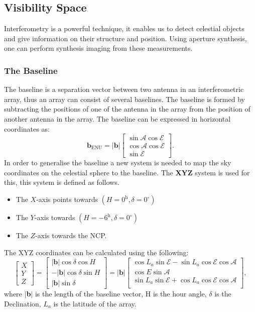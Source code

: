 \subsection{Visibility Space}
Interferometry is a powerful technique, it enables us to detect celestial objects and give information on their structure and position. Using aperture synthesis, one can perform synthesis imaging from these measurements\cite{TEXTBOOK}. 
\subsubsection{The Baseline}
The baseline is a separation vector between two antenna in an interferometric array, thus an array can consist of several baselines. The baseline is formed by subtracting the positions of one of the antenna in the array from the position of another antenna in the array. The baseline can be expressed in horizontal coordinates as: \begin{equation*}
\mathbf{b}_{\text{ENU}}
=
\lvert \mathbf{b} \rvert
\begin{bmatrix}
\sin \mathcal{A} \cos \mathcal{E}\\
\cos \mathcal{A} \cos \mathcal{E}\\
\sin \mathcal{E}
\end{bmatrix}.
\end{equation*}
In order to generalise the baseline a new system is needed to map the sky coordinates on the celestial sphere to the baseline. The \textbf{XYZ} system is used for this, this system is defined as follows.
\begin{itemize}
    \item The $X$-axis points towards $(H=0^\textrm{h}, \delta = 0^{\circ})$ 
    \item The $Y$-axis towards $(H=-6^\textrm{h}, \delta = 0^{\circ})$ 
    \item The $Z$-axis towards the NCP.
\end{itemize}
The XYZ coordinates can be calculated using the following:
\begin{equation}
\begin{bmatrix}
X\\Y\\Z
\end{bmatrix}=
\begin{bmatrix}
\lvert \mathbf{b} \rvert \cos \delta \cos H\\
-\lvert \mathbf{b} \rvert \cos \delta \sin H\\
\lvert \mathbf{b} \rvert \sin \delta
\end{bmatrix}
= \lvert \mathbf{b} \rvert
\begin{bmatrix}
\cos L_a \sin \mathcal{E} - \sin L_a \cos \mathcal{E} \cos \mathcal{A}\nonumber\\ 
\cos E \sin \mathcal{A} \nonumber\\
\sin L_a \sin \mathcal{E} + \cos L_a \cos \mathcal{E} \cos \mathcal{A}\\
\end{bmatrix},
\end{equation}
where $|$\textbf{b}$|$ is the length of the baseline vector, H is the hour angle, $\delta$ is the Declination, $L_a$ is the latitude of the array.
